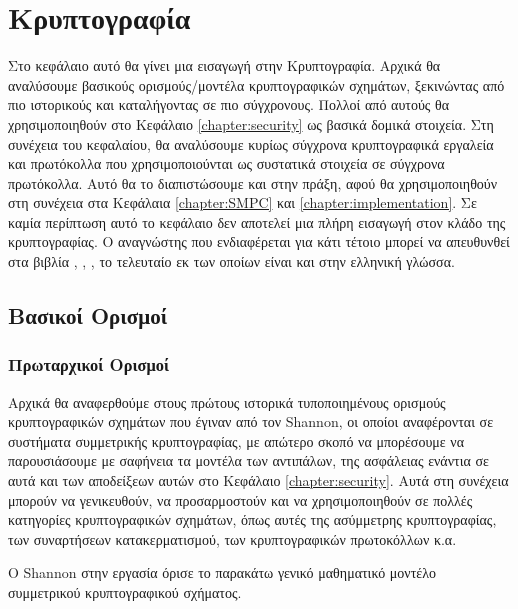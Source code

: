 \chapter{Κρυπτογραφία}
\label{chapter:cryptography}

Στο κεφάλαιο αυτό θα γίνει μια εισαγωγή στην Κρυπτογραφία. Αρχικά θα αναλύσουμε βασικούς ορισμούς/μοντέλα κρυπτογραφικών σχημάτων, ξεκινώντας από πιο ιστορικούς και καταλήγοντας σε πιο σύγχρονους. Πολλοί από αυτούς θα χρησιμοποιηθούν στο Κεφάλαιο \ref{chapter:security} ως βασικά δομικά στοιχεία. Στη συνέχεια του κεφαλαίου, θα αναλύσουμε κυρίως σύγχρονα κρυπτογραφικά εργαλεία και πρωτόκολλα που χρησιμοποιούνται ως συστατικά στοιχεία σε σύγχρονα πρωτόκολλα. Αυτό θα το διαπιστώσουμε και στην πράξη, αφού θα χρησιμοποιηθούν στη συνέχεια στα Κεφάλαια \ref{chapter:SMPC} και \ref{chapter:implementation}. Σε καμία περίπτωση αυτό το κεφάλαιο δεν αποτελεί μια πλήρη εισαγωγή στον κλάδο της κρυπτογραφίας. Ο αναγνώστης που ενδιαφέρεται για κάτι τέτοιο μπορεί να απευθυνθεί στα βιβλία \cite{boneh2020graduate}, \cite{hoffstein2008introduction}, \cite{pagourtzis2016computational}, το τελευταίο εκ των οποίων είναι και στην ελληνική γλώσσα.

\section{Βασικοί Ορισμοί}

\subsection{Πρωταρχικοί Ορισμοί}

Αρχικά θα αναφερθούμε στους πρώτους ιστορικά τυποποιημένους ορισμούς κρυπτογραφικών σχημάτων που έγιναν από τον Shannon, οι οποίοι αναφέρονται σε συστήματα συμμετρικής κρυπτογραφίας, με απώτερο σκοπό να μπορέσουμε να παρουσιάσουμε με σαφήνεια τα μοντέλα των αντιπάλων, της ασφάλειας ενάντια σε αυτά και των αποδείξεων αυτών στο Κεφάλαιο \ref{chapter:security}. Αυτά στη συνέχεια μπορούν να γενικευθούν, να προσαρμοστούν και να χρησιμοποιηθούν σε πολλές κατηγορίες κρυπτογραφικών σχημάτων, όπως αυτές της ασύμμετρης κρυπτογραφίας, των συναρτήσεων κατακερματισμού, των κρυπτογραφικών πρωτοκόλλων κ.α.

Ο Shannon στην εργασία \cite{shannon1945mathematical} όρισε το παρακάτω γενικό μαθηματικό μοντέλο συμμετρικού κρυπτογραφικού σχήματος.

